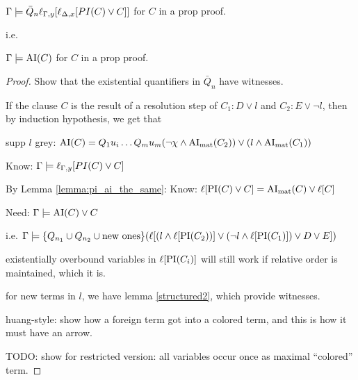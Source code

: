 \documentclass[,%
	paper=a4,%
	DIV20, 
	liststotoc,
	bibtotoc,
	draft=false,%
	numbers=noendperiod
]{scrartcl}
\begin{document}
\begin{lemma}
	$\Gamma \models \bar Q_n  \ell_{\Gamma,y}[ \ell_{\Delta,x}[PI(C)\lor C] ] $ for $C$ in a prop proof.

	i.e.

	$\Gamma \models \operatorname{AI}(C) $ for $C$ in a prop proof.
\end{lemma}
\begin{proof}
	Show that the existential quantifiers in $\bar Q_n$ have witnesses.

	If the clause $C$ is the result of a resolution step of $C_1: D \lor l$ and $C_2: E \lor \lnot l$, then by induction hypothesis, we get that

	supp $l$ grey:
	$\operatorname{AI}(C) = Q_1 u_i\dots Q_m u_m (\lnot \chi \land \operatorname{AI}_\mathrm{mat}(C_2)) \lor (l \land \operatorname{AI}_\mathrm{mat}(C_1)) $

	Know:   $\Gamma \models  \ell_{\Gamma,y}[{PI(C)\lor C} ]$

	By Lemma \ref{lemma:pi_ai_the_same}:
	Know:   $  \ell[{{\operatorname{PI}(C)\lor C} }] = \operatorname{AI}_\mathrm{mat}(C) \lor \ell[C]$


	Need:
	$\Gamma \models \operatorname{AI}(C) \lor C$ 

	i.e.
	$\Gamma \models \{Q_{n_1} \cup Q_{n_2} \cup \text{new ones}\} ( \ell[(l \land \ell[ \operatorname{PI}(C_2)) ] \lor (\lnot l \land \ell[\operatorname{PI}(C_1)]) \lor D \lor E ])$



	existentially overbound variables in $\ell[\operatorname{PI}(C_i)]$ will still work if relative order is maintained, which it is.

	for new terms in $l$, we have lemma \ref{structured2}, which provide witnesses.

	huang-style: show how a foreign term got into a colored term, and this is how it must have an arrow.


	TODO: show for restricted version: all variables occur once as maximal ``colored'' term. 




\end{proof}


\clearpage
\end{document}
